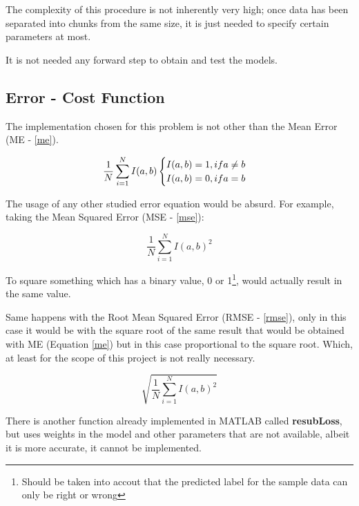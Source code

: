 \documentclass[11pt]{article}
\begin{document}
The complexity of this procedure is not inherently very high; once data has been
separated into chunks from the same size, it is just needed to specify certain
parameters at most.

It is not needed any forward step to obtain and test the models.

\subsection{Error - Cost Function}

The implementation chosen for this problem is not other than the Mean Error
(ME - \hyperref[me]{\ref{me}}).

\begin{equation}
 \centering
 \frac{1}{N} \sum_{i=1}^{N} {I(a, b)} \label{me}

 \begin{cases}
  I(a, b) = 1, if a \neq b\\
  I(a, b) = 0, if a = b
 \end{cases}
\end{equation}

The usage of any other studied error equation would be absurd. For example,
taking the Mean Squared Error (MSE - \hyperref[mse]{\ref{mse}}):

\begin{equation}
 \frac{1}{N} \sum_{i=1}^{N} {I(a, b)^2} \label{mse}
\end{equation}

To square something which has a binary value, 0 or 1\footnote{Should be taken
into accout that the predicted label for the sample data can only be right or
wrong}, would actually result in the same value. 

Same happens with the Root Mean Squared Error (RMSE - 
\hyperref[rmse]{\ref{rmse}}), only in this case it would be with the square root 
of the same result that would be obtained with ME (Equation 
\hyperref[me]{\ref{me}}) but in this case proportional to the square root. 
Which, at least for the scope of this project is not really necessary.

\begin{equation}
 \sqrt{\frac{1}{N} \sum_{i=1}^{N} {I(a, b)^2}} \label{rmse}
\end{equation}

There is another function already implemented in MATLAB called 
\textbf{resubLoss}, but uses weights in the model and other parameters that are
not available, albeit it is more accurate, it cannot be implemented.
\end{document}
